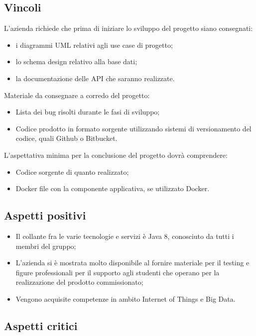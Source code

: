 \subsection{Vincoli}
L'azienda richiede che prima di iniziare lo sviluppo del progetto siano consegnati:
\begin{itemize}
\item i diagrammi UML relativi agli use case di progetto;
\item lo schema design relativo alla base dati;
\item la documentazione delle API che saranno realizzate. 
\end{itemize}
Materiale da consegnare a corredo del progetto: 
\begin{itemize}
\item Lista dei bug risolti durante le fasi di sviluppo;
\item Codice prodotto in formato sorgente utilizzando sistemi di versionamento del codice, quali Github o Bitbucket.
\end{itemize}
L'aspettativa minima per la conclusione del progetto dovr\`a comprendere: 
\begin{itemize}
\item Codice sorgente di quanto realizzato;
\item Docker file con la componente applicativa, se utilizzato Docker.
\end{itemize}

\subsection{Aspetti positivi}
\begin{itemize}
\item Il collante fra le varie tecnologie e servizi \`e Java 8, conosciuto da tutti i membri del gruppo;
\item L'azienda si \`e mostrata molto disponibile al fornire materiale per il testing e figure professionali per il supporto agli studenti che operano per la realizzazione del prodotto commissionato;
\item Vengono acquisite competenze in ambito Internet of Things e Big Data.
\end{itemize}

\subsection{Aspetti critici}

